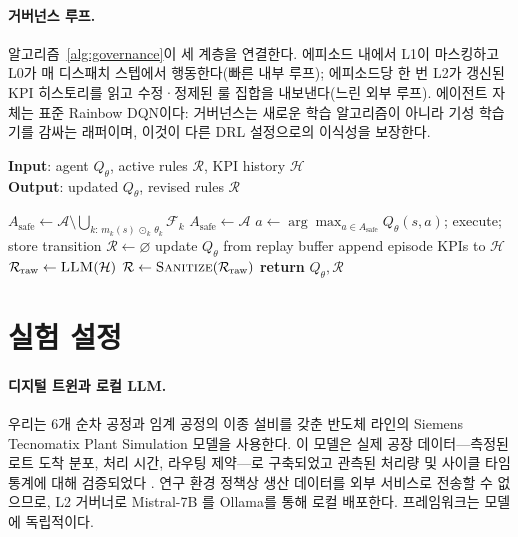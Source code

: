 \documentclass[letterpaper]{article} %
\begin{document}
\paragraph{거버넌스 루프.}
알고리즘~\ref{alg:governance}이 세 계층을 연결한다. 에피소드 내에서 L1이 마스킹하고
L0가 매 디스패치 스텝에서 행동한다(빠른 내부 루프); 에피소드당 한 번 L2가 갱신된 KPI
히스토리를 읽고 수정·정제된 룰 집합을 내보낸다(느린 외부 루프). 에이전트 자체는 표준
Rainbow DQN이다: 거버넌스는 새로운 학습 알고리즘이 아니라 기성 학습기를 감싸는 래퍼이며,
이것이 다른 DRL 설정으로의 이식성을 보장한다.

\begin{algorithm}[t]
\caption{LLM-governed training episode}
\label{alg:governance}
\textbf{Input}: agent $Q_\theta$, active rules $\mathcal{R}$, KPI history $\mathcal{H}$\\
\textbf{Output}: updated $Q_\theta$, revised rules $\mathcal{R}$
\begin{algorithmic}[1]
  \STATE $A_{\text{safe}} \gets \mathcal{A}\setminus\bigcup_{k:\,m_k(s)\,\odot_k\,\theta_k}\mathcal{F}_k$ 
     \STATE $A_{\text{safe}}\gets\mathcal{A}$ 
  \ENDIF
  \STATE $a\gets\arg\max_{a\in A_{\text{safe}}}Q_\theta(s,a)$; execute; store transition
     \STATE $\mathcal{R}\gets\varnothing$ 
  \ENDIF
  \STATE update $Q_\theta$ from replay buffer
\ENDFOR
\STATE append episode KPIs to $\mathcal{H}$
\STATE $\mathcal{R}_{\text{raw}}\gets\textsc{LLM}(\mathcal{H})$ 
\STATE $\mathcal{R}\gets\textsc{Sanitize}(\mathcal{R}_{\text{raw}})$ 
\STATE \textbf{return} $Q_\theta,\mathcal{R}$
\end{algorithmic}
\end{algorithm}

\section{실험 설정}
\label{sec:setup}

\paragraph{디지털 트윈과 로컬 LLM.}
우리는 6개 순차 공정과 임계 공정의 이종 설비를 갖춘 반도체 라인의 Siemens
Tecnomatix Plant Simulation 모델을 사용한다. 이 모델은 실제 공장 데이터---측정된
로트 도착 분포, 처리 시간, 라우팅 제약---로 구축되었고 관측된 처리량 및 사이클
타임 통계에 대해 검증되었다 \citep{siemens2023tecnomatix}. 연구 환경 정책상 생산
데이터를 외부 서비스로 전송할 수 없으므로, L2 거버너로 Mistral-7B \citep{jiang2023}를
Ollama를 통해 로컬 배포한다. 프레임워크는 모델에 독립적이다.
\end{document}
